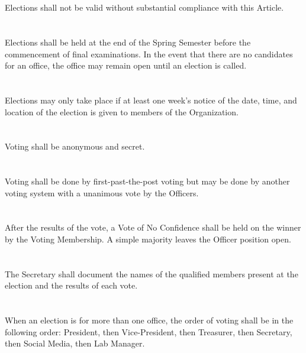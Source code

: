 \documentclass[12pt]{cls/constitution}
\begin{document}

\section{}
Elections shall not be valid without substantial compliance with this Article. 

\section{}
Elections shall be held at the end of the Spring Semester before the commencement of final examinations.  In the event that there are no candidates for an office, the office may remain open until an election is called.

\section{}
Elections may only take place if at least one week’s notice of the date, time, and location of the election is given to members of the Organization.

\section{}
Voting shall be anonymous and secret.

\section{}
Voting shall be done by first-past-the-post voting but may be done by another voting system with a unanimous vote by the Officers.

\section{}
After the results of the vote, a Vote of No Confidence shall be held on the winner by the Voting Membership. A simple majority leaves the Officer position open.

\section{}
The Secretary shall document the names of the qualified members present at the election and the results of each vote.

\section{}
When an election is for more than one office, the order of voting shall be in the following order: President, then Vice-President, then Treasurer, then Secretary, then Social Media, then Lab Manager.
\end{document}

